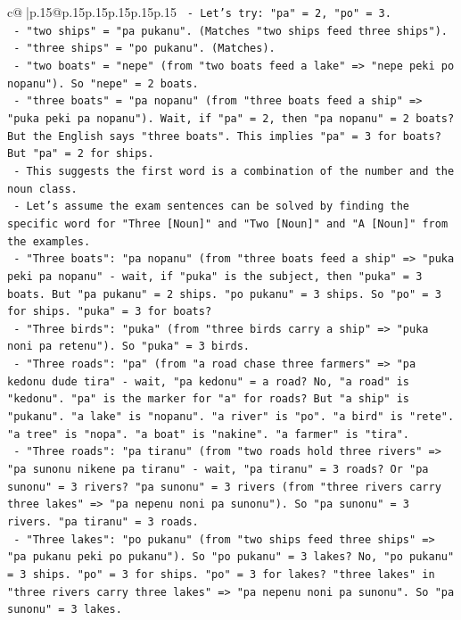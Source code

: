 \documentclass{article}
\begin{document}
{\begin{supertabular}{c@{$\;$}|p{.15\linewidth}@{}p{.15\linewidth}p{.15\linewidth}p{.15\linewidth}p{.15\linewidth}p{.15\linewidth}}
{{{\texttt{            {-} Let's try: "pa" = 2, "po" = 3.} \\
\texttt{              {-} "two ships" = "pa pukanu". (Matches "two ships feed three ships").} \\
\texttt{              {-} "three ships" = "po pukanu". (Matches).} \\
\texttt{              {-} "two boats" = "nepe" (from "two boats feed a lake" => "nepe peki po nopanu"). So "nepe" = 2 boats.} \\
\texttt{              {-} "three boats" = "pa nopanu" (from "three boats feed a ship" => "puka peki pa nopanu"). Wait, if "pa" = 2, then "pa nopanu" = 2 boats? But the English says "three boats". This implies "pa" = 3 for boats? But "pa" = 2 for ships.} \\
\texttt{              {-} This suggests the first word is a combination of the number and the noun class.} \\
\texttt{              {-} Let's assume the exam sentences can be solved by finding the specific word for "Three {[}Noun{]}" and "Two {[}Noun{]}" and "A {[}Noun{]}" from the examples.} \\
\texttt{              {-} "Three boats": "pa nopanu" (from "three boats feed a ship" => "puka peki pa nopanu" {-} wait, if "puka" is the subject, then "puka" = 3 boats. But "pa pukanu" = 2 ships. "po pukanu" = 3 ships. So "po" = 3 for ships. "puka" = 3 for boats?} \\
\texttt{              {-} "Three birds": "puka" (from "three birds carry a ship" => "puka noni pa retenu"). So "puka" = 3 birds.} \\
\texttt{              {-} "Three roads": "pa" (from "a road chase three farmers" => "pa kedonu dude tira" {-} wait, "pa kedonu" = a road? No, "a road" is "kedonu". "pa" is the marker for "a" for roads? But "a ship" is "pukanu". "a lake" is "nopanu". "a river" is "po". "a bird" is "rete". "a tree" is "nopa". "a boat" is "nakine". "a farmer" is "tira".} \\
\texttt{              {-} "Three roads": "pa tiranu" (from "two roads hold three rivers" => "pa sunonu nikene pa tiranu" {-} wait, "pa tiranu" = 3 roads? Or "pa sunonu" = 3 rivers? "pa sunonu" = 3 rivers (from "three rivers carry three lakes" => "pa nepenu noni pa sunonu"). So "pa sunonu" = 3 rivers. "pa tiranu" = 3 roads.} \\
\texttt{              {-} "Three lakes": "po pukanu" (from "two ships feed three ships" => "pa pukanu peki po pukanu"). So "po pukanu" = 3 lakes? No, "po pukanu" = 3 ships. "po" = 3 for ships. "po" = 3 for lakes? "three lakes" in "three rivers carry three lakes" => "pa nepenu noni pa sunonu". So "pa sunonu" = 3 lakes.} \\
}}}
\end{supertabular}}
\end{document}
